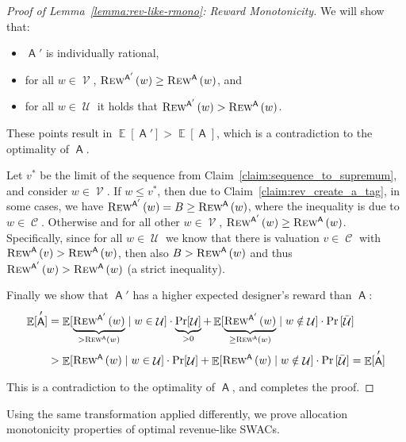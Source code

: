 \documentclass[11pt,letterpaper]{article}
\newcommand{\sqbr}[1]{\left[ #1 \right]}
\newcommand{\swacs}{SWACs\xspace}
\DeclareMathOperator*{\E}{\bb{E}}
\newcommand{\bb}[1]{\mathbb{#1}}
\DeclareMathOperator{\A}{\auc{A}}
\DeclareMathOperator{\C}{\mathcal{C}}
\DeclareMathOperator{\U}{\mathcal{U}}
\DeclareMathOperator{\V}{\mathcal{V}}
\newcommand{\vstar}{{v^*}}
\theoremstyle{plain}
\newcommand{\auc}[1]{\mathsf{#1}}
\begin{document}
\begin{proof}[Proof of Lemma~\ref{lemma:rev-like-rmono}: Reward Monotonicity]
     
     We will show that:
    \begin{itemize}
        \item $\A'$ is individually rational,
        \item for all $w\in\V$, $\trew[\A']{w}\geq \trew[\A]{w}$, and
        \item for all $w\in\U$ it holds that $\trew[\A']{w}>\trew[\A]{w}$.
    \end{itemize}
    These points result in $\E[\A']>\E[\A]$, which is a contradiction to the optimality of $\A$.

    Let $\vstar$ be the limit of the sequence from Claim~\ref{claim:sequence_to_supremum}, and consider $w\in\V$. If $w\leq\vstar$, then due to Claim~\ref{claim:rev_create_a_tag}, in some cases, we have $\trew[\A']{w}=B\geq \trew[\A]{w}$, where the inequality is due to $w\in\C$. Otherwise and for all other $w\in\V$, $\trew[\A']{w}\geq \trew[\A]{w}$.  Specifically, since for all $w\in\U$ we know that there is valuation $v\in\C$ with $\trew[\A]{v}>\trew[\A]{w}$, then also $B>\trew[\A]{w}$ and thus $\trew[\A']{w}>\trew[\A]{w}$ (a strict inequality).

    Finally we show that $\A'$ has a higher expected designer's reward than $\A$:
    \begin{align*}
        \E[\A']&=\E[\underbrace{\trew[\A']{w}}_{>\trew[\A]{w}}\mid w\in\U]\cdot\underbrace{\Pr[\U]}_{>0}+\E[\underbrace{\trew[\A']{w}}_{\geq \trew[\A]{w}}\mid w\notin\U]\cdot\Pr\sqbr{\Bar{\U}}\\
        &>\E[\trew[\A]{w}\mid w\in\U]\cdot\Pr[\U]+\E[\trew[\A]{w}\mid w\notin\U]\cdot\Pr\sqbr{\Bar{\U}}
        =\E[\A']
    \end{align*}

    This is a contradiction to the optimality of $\A$, and completes the proof.
\end{proof}

Using the same transformation applied differently, we prove allocation monotonicity properties of optimal revenue-like \swacs.
\end{document}
